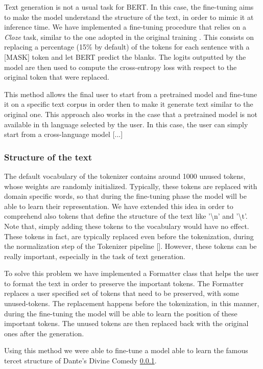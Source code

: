 \documentclass[10pt,twocolumn,letterpaper]{article}
\begin{document}
Text generation is not a usual task for BERT.
In this case, the fine-tuning aims to make the model understand the structure of the text,
in order to mimic it at inference time.
We have implemented a fine-tuning procedure that relies on a \textit{Cloze} task, similar to the one adopted in the
 original training \cite{wang2019bert}.
This consists on replacing a percentage (15\% by default) of the tokens for each sentence with a [MASK] token and let
BERT predict the blanks. The logits outputted by the model are then used to compute the cross-entropy
loss with respect to the original token that were replaced.

This method allows the final user to start from a pretrained model and fine-tune it on a specific
text corpus in order then to make it generate text similar to the original one.
This approach also works  in the case that a pretrained model is not available in th language selected by the user.
In this case, the user can simply start from a cross-language model [...]

\subsubsection{Structure of the text}
The default vocabulary of the tokenizer contains around 1000 unused tokens, whose weights are randomly initialized.
Typically, these tokens are replaced with domain specific words, so that during the fine-tuning phase
the model will be able to learn their representation.
We have extended this idea in order to comprehend also tokens that define the structure of the text like
'\textbackslash n' and '\textbackslash t'.
Note that, simply adding these tokens to the vocabulary would have no effect.
These tokens in fact, are typically replaced even before the tokenization, during the normalization step of the Tokenizer pipeline [].
However, these tokens can be really important, especially in the task of text generation.

To solve this problem we have implemented a Formatter class that helps the user to format the text in order
to preserve the important tokens.
The Formatter replaces a user specified set of tokens that need to be preserved, with some unused-tokens.
The replacement happens before the tokenization, in this manner, during the fine-tuning the model will be able to learn
the position of these important tokens.
The unused tokens are then replaced back with the original ones after the generation.

Using this method we were able to fine-tune a model able to learn the famous tercet structure of Dante's Divine Comedy \ref{}.
\end{document}
